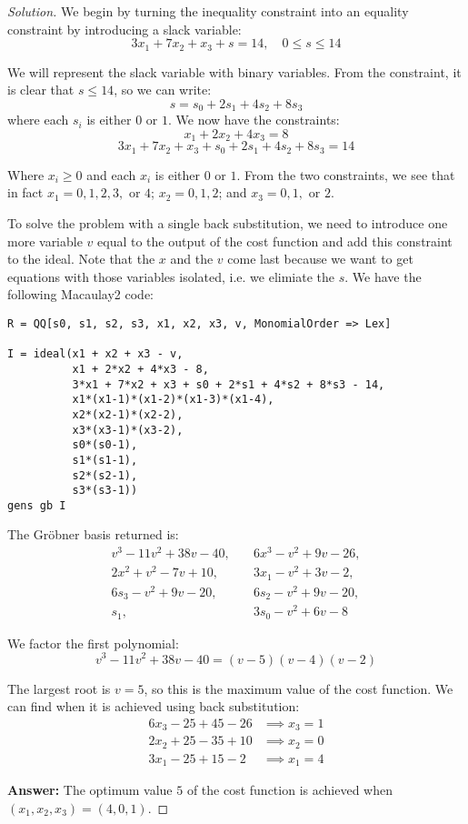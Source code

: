 \documentclass[12pt]{article}
\newcounter{problem}
\newenvironment{solution}
    {\renewcommand{\qedsymbol}{}\begin{proof}[Solution]}
    {\end{proof}}
\begin{document}
\begin{solution}
	We begin by turning the inequality constraint into an equality constraint by introducing a slack variable:
\[
3x_1 + 7x_2 + x_3 + s = 14, \quad 0 \leq s \leq 14
\]

We will represent the slack variable with binary variables. From the constraint, it is clear that \(s \leq 14\), so we can write:
\[
s = s_0 + 2s_1 + 4s_2 + 8s_3
\]
where each \(s_i\) is either \(0\) or \(1\). We now have the constraints:
\[
x_1 + 2x_2 + 4x_3 = 8
\]
\[
3x_1 + 7x_2 + x_3 + s_0 + 2s_1 + 4s_2 + 8s_3 = 14
\]

Where \(x_i \geq 0\) and each \(x_i\) is either \(0\) or \(1\). From the two constraints, we see that in fact \(x_1 = 0, 1, 2, 3, \text{ or } 4\); \(x_2 = 0, 1, 2\); and \(x_3 = 0, 1, \text{ or } 2\). 


To solve the problem with a single back substitution, we need to introduce one more variable \(v\) equal to the output of the cost function and add this constraint to the ideal. Note that the $x$ and the $v$ come last because we want to get equations with those variables isolated, i.e. we elimiate the $s$. We have the following Macaulay2 code:


\begin{verbatim}
R = QQ[s0, s1, s2, s3, x1, x2, x3, v, MonomialOrder => Lex]

I = ideal(x1 + x2 + x3 - v,
          x1 + 2*x2 + 4*x3 - 8, 
          3*x1 + 7*x2 + x3 + s0 + 2*s1 + 4*s2 + 8*s3 - 14,
          x1*(x1-1)*(x1-2)*(x1-3)*(x1-4),
          x2*(x2-1)*(x2-2),
          x3*(x3-1)*(x3-2),
          s0*(s0-1),
          s1*(s1-1),
          s2*(s2-1),
          s3*(s3-1))
gens gb I
\end{verbatim}

The Gröbner basis returned is:
\[
\begin{aligned}
	v^3 - 11v^2 + 38v - 40, \quad & 6x^3 - v^2 + 9v - 26, \\
	2x^2 + v^2 - 7v + 10, \quad & 3x_1 - v^2 + 3v - 2, \\
	6s_3 - v^2 + 9v - 20, \quad & 6s_2 - v^2 + 9v - 20, \\
	s_1, \quad & 3s_0 - v^2 + 6v - 8
\end{aligned}
\]

We factor the first polynomial:
\[
v^3 - 11v^2 + 38v - 40 = (v-5)(v-4)(v-2)
\]

The largest root is \(v=5\), so this is the maximum value of the cost function. We can find when it is achieved using back substitution:
\begin{align*}
6x_3 - 25 + 45 - 26 & \implies x_3 = 1 \\
2x_2 + 25 - 35 + 10 & \implies x_2 = 0 \\
3x_1 - 25 + 15 - 2 & \implies x_1 = 4
\end{align*}

\textbf{Answer:} The optimum value \(5\) of the cost function is achieved when \((x_1, x_2, x_3) = (4, 0, 1)\).
\end{solution}
\end{document}
